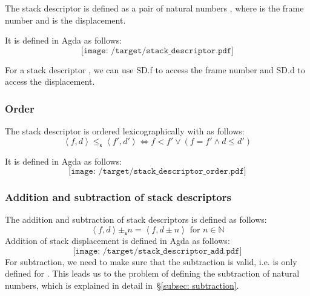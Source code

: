 \documentclass[12pt,a4paper]{report}
\theoremstyle{definition}
\newcommand{\secref}[1]{\S\ref{#1}}
\newcommand{\dpink}[1]{\textcolor{darkpink}{#1}}
\newcommand{\ang}[1]{\left\langle #1 \right\rangle}
\begin{document}
    The stack descriptor  is defined as a pair of natural numbers \text{\ang{f, d}}, where  is the frame number and  is the displacement. 

    It is defined in Agda as follows:
    \[\texttt{[image: /target/stack\_descriptor.pdf]}\]

    For a stack descriptor , we can use \dpink{SD.f}  to access the frame number and \dpink{SD.d}  to access the displacement. 

    \subsubsection{Order}
    The stack descriptor is ordered lexicographically with  as follows:
    \[\ang{f, d} \leq_\mathsf{s} \ang{f', d'} \Leftrightarrow f < f' \lor (f = f' \land d \leq d')\]

    It is defined in Agda as follows:
    \[\texttt{[image: /target/stack\_descriptor\_order.pdf]}\]

    \subsubsection{Addition and subtraction of stack descriptors}
    The addition and subtraction of stack descriptors is defined as follows:
    \[\ang{f, d} \pm_\mathsf{s} n = \ang{f, d \pm n} \text{ for } n \in \mathbb{N}\]
    Addition of stack displacement is defined in Agda as follows:
    \[\texttt{[image: /target/stack\_descriptor\_add.pdf]}\]
    For subtraction, we need to make sure that the subtraction is valid, i.e. \text{\ang{f, d} -\mathsf{s} n} is only defined for . This leads us to the problem of defining the subtraction of natural numbers, which is explained in detail in~\secref{subsec: subtraction}.
\end{document}
